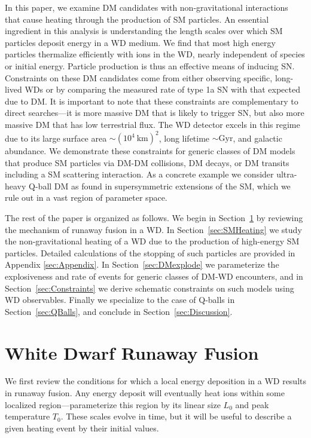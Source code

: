 \documentclass[preprintnumbers,amsmath,amssymb,prd, superscriptaddress,twocolumn]{revtex4}
\begin{document}
In this paper, we examine DM candidates with non-gravitational interactions that cause heating through the production of SM particles.
An essential ingredient in this analysis is understanding the length scales over which SM particles deposit energy in a WD medium.
We find that most high energy particles thermalize efficiently with ions in the WD, nearly independent of species or initial energy.
Particle production is thus an effective means of inducing SN.
Constraints on these DM candidates come from either observing specific, long-lived WDs or by comparing the measured rate of type 1a SN with that expected due to DM.
It is important to note that these constraints are complementary to direct searches---it is more massive DM that is likely to trigger SN, but also more massive DM that has low terrestrial flux.
The WD detector excels in this regime due to its large surface area $\sim (10^4 ~\text{km})^2$, long lifetime $\sim \text{Gyr}$, and galactic abundance.
We demonstrate these constraints for generic classes of DM models that produce SM particles via DM-DM collisions, DM decays, or DM transits including a SM scattering interaction.
As a concrete example we consider ultra-heavy Q-ball DM as found in supersymmetric extensions of the SM, which we rule out in a vast region of parameter space.

The rest of the paper is organized as follows.
We begin in Section~\ref{sec:Review} by reviewing the mechanism of runaway fusion in a WD.
In Section~\ref{sec:SMHeating} we study the non-gravitational heating of a WD due to the production of high-energy SM particles.
Detailed calculations of the stopping of such particles are provided in Appendix \ref{sec:Appendix}.
In Section~\ref{sec:DMexplode} we parameterize the explosiveness and rate of events for generic classes of DM-WD encounters, and in Section~\ref{sec:Constraints} we derive schematic constraints on such models using WD observables.
Finally we specialize to the case of Q-balls in Section~\ref{sec:QBalls}, and conclude in Section~\ref{sec:Discussion}.

\section{White Dwarf Runaway Fusion}
\label{sec:Review}

We first review the conditions for which a local energy deposition in a WD results in runaway fusion.
Any energy deposit will eventually heat ions within some localized region---parameterize this region by its linear size $L_0$ and peak temperature $T_0$.
These scales evolve in time, but it will be useful to describe a given heating event by their initial values.
\end{document}
